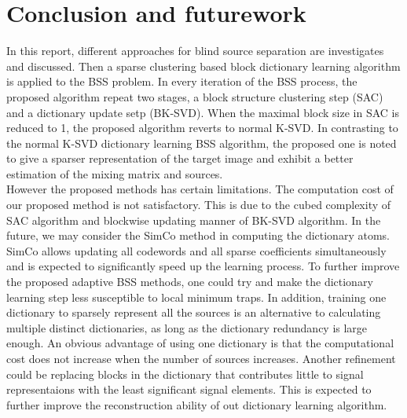 \section{Conclusion and futurework}
In this report, different approaches for blind source separation are investigates and discussed. Then a sparse clustering based block dictionary learning algorithm is applied to the BSS problem. In every iteration of the BSS process, the proposed algorithm repeat two stages, a block structure clustering step (SAC) and a dictionary update setp (BK-SVD). When the maximal block size in SAC is reduced to 1, the proposed algorithm reverts to normal K-SVD. In contrasting to the normal K-SVD dictionary learning BSS algorithm, the proposed one is noted to give a sparser representation of the target image and exhibit a better estimation of the mixing matrix and sources.\\

However the proposed methods has certain limitations. The computation cost of our proposed method is not satisfactory. This is due to the cubed complexity of SAC algorithm and blockwise updating manner of BK-SVD algorithm. In the future, we may consider the SimCo method \cite{6340354} in computing the dictionary atoms. SimCo allows updating all codewords and all sparse coefficients simultaneously and is expected to significantly speed up the learning process. To further improve the proposed adaptive BSS methods, one could try and make the dictionary learning step less susceptible to local minimum traps. In addition, training one dictionary to sparsely represent all the sources is an alternative to calculating multiple distinct dictionaries, as long as the dictionary redundancy is large enough. An obvious advantage of using one dictionary is that the computational cost does not increase when the number of sources increases. Another refinement could be replacing blocks in the dictionary that contributes little to signal representaions with the least significant signal elements. This is expected to further improve the reconstruction ability of out dictionary learning algorithm.  

